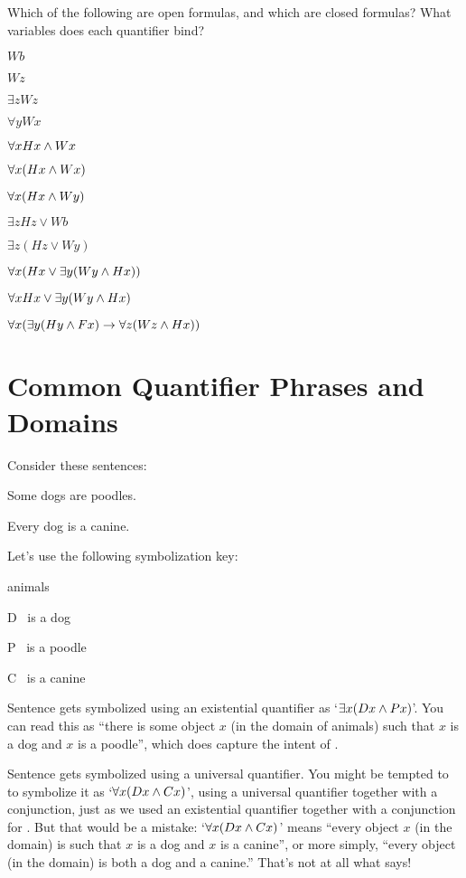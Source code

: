 \problempart Which of the following are open formulas, and which are closed formulas?  What variables does each quantifier bind?

\begin{earg}
\item $Wb$
\item $Wz$
\item $\exists z Wz$
\item $\forall yWx$
\item $\forall xHx \wedge  Wx$
\item $\forall x(Hx \wedge  Wx)$
\item $\forall x(Hx \wedge  Wy)$
\item $\exists z Hz \lor  Wb$
\item $\exists  z(Hz \lor Wy)$
\item $\forall x(Hx \lor \exists y(Wy \wedge Hx))$
\item $\forall xHx \lor \exists y(Wy \wedge Hx)$
\item $\forall x(\exists y(Hy \land Fx) \rightarrow \forall z(Wz \wedge Hx))$
\end{earg}


\section{Common Quantifier Phrases and Domains}\label{s:QuantifierPhrases}
Consider these sentences:
	\begin{earg}
		\item[\ex{quan2}] Some dogs are poodles.
		\item[\ex{quan1}] Every dog is a canine.
	\end{earg}
Let's use the following symbolization key:
	\begin{ekey}
		\item[\text{Domain}] animals
		\item[D] \blank\ is a dog
		\item[P] \blank\ is  a poodle
		\item[C] \blank\ is a canine
	\end{ekey}
Sentence  gets symbolized using an existential quantifier as `$\exists x(Dx \wedge Px)$'.  You can read this as ``there is some object $x$ (in the domain of animals) such that $x$ is a dog and $x$ is a poodle'', which does capture the intent of .

Sentence  gets symbolized using a universal quantifier.  You might be tempted to to symbolize it as `$\forall x(Dx \wedge Cx)$', using a universal quantifier together with a conjunction, just as we used an existential quantifier together with a conjunction for .  But that would be a mistake: `$\forall x(Dx \wedge Cx)$' means ``every object $x$ (in the domain) is such that $x$ is a dog and $x$ is a canine'', or more simply, ``every object (in the domain) is both a dog and a canine.''  That's not at all what  says!

